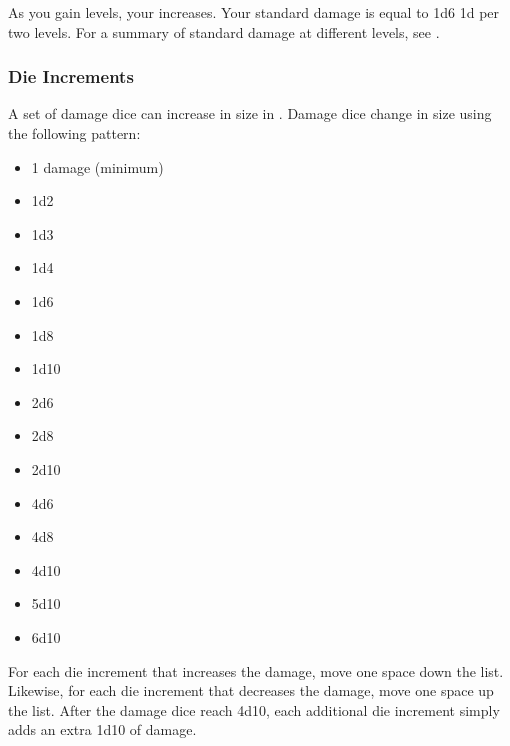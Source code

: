         As you gain levels, your  increases.
        Your standard damage is equal to 1d6 \plus1d per two levels.
        For a summary of standard damage at different levels, see .

        \subsubsection{Die Increments}\label{Die Increments}
            A set of damage dice can increase in size in .
            Damage dice change in size using the following pattern:
            \begin{itemize}
                \item 1 damage (minimum)
                \item 1d2
                \item 1d3
                \item 1d4
                \item 1d6
                \item 1d8
                \item 1d10
                \item 2d6
                \item 2d8
                \item 2d10
                \item 4d6
                \item 4d8
                \item 4d10
                \item 5d10
                \item 6d10
            \end{itemize}

            For each die increment that increases the damage, move one space down the list.
            Likewise, for each die increment that decreases the damage, move one space up the list.
            After the damage dice reach 4d10, each additional die increment simply adds an extra 1d10 of damage.

